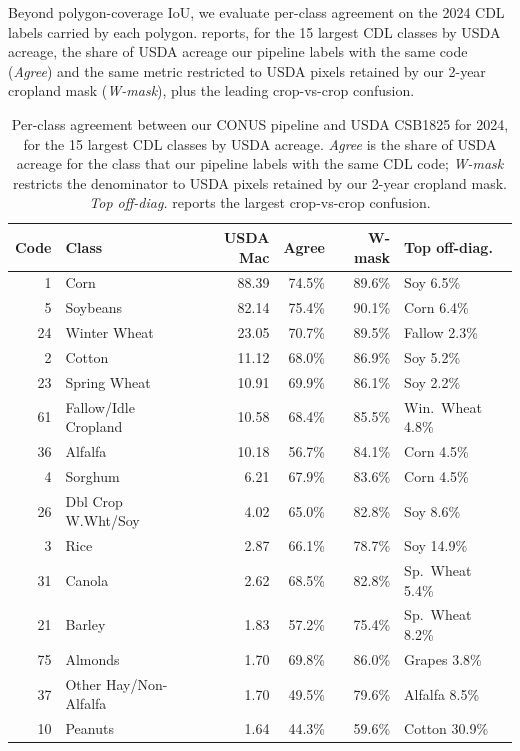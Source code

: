 \documentclass[preprint,12pt]{elsarticle}
\begin{document}
Beyond polygon-coverage IoU, we evaluate per-class agreement on the
2024 CDL labels carried by each polygon.  reports,
for the 15 largest CDL classes by USDA acreage, the share of USDA
acreage our pipeline labels with the same code (\emph{Agree}) and the
same metric restricted to USDA pixels retained by our 2-year cropland
mask (\emph{W-mask}), plus the leading crop-vs-crop confusion.

\begin{table}[t]
\centering
\caption{Per-class agreement between our CONUS pipeline and USDA
CSB1825 for 2024, for the 15 largest CDL classes by USDA acreage.
\emph{Agree} is the share of USDA acreage for the class that our
pipeline labels with the same CDL code; \emph{W-mask} restricts the
denominator to USDA pixels retained by our 2-year cropland mask.
\emph{Top off-diag.} reports the largest crop-vs-crop confusion.}
\label{tab:per-class}
\small
\setlength{\tabcolsep}{4pt}
\begin{tabular}{@{}rlrrrl@{}}
\toprule
Code & Class & USDA Mac & Agree & W-mask & Top off-diag. \\
\midrule
  1 & Corn                      & 88.39 & 74.5\% & 89.6\% & Soy 6.5\%        \\
  5 & Soybeans                  & 82.14 & 75.4\% & 90.1\% & Corn 6.4\%       \\
 24 & Winter Wheat              & 23.05 & 70.7\% & 89.5\% & Fallow 2.3\%     \\
  2 & Cotton                    & 11.12 & 68.0\% & 86.9\% & Soy 5.2\%        \\
 23 & Spring Wheat              & 10.91 & 69.9\% & 86.1\% & Soy 2.2\%        \\
 61 & Fallow/Idle Cropland      & 10.58 & 68.4\% & 85.5\% & Win.\ Wheat 4.8\%\\
 36 & Alfalfa                   & 10.18 & 56.7\% & 84.1\% & Corn 4.5\%       \\
  4 & Sorghum                   &  6.21 & 67.9\% & 83.6\% & Corn 4.5\%       \\
 26 & Dbl Crop W.Wht/Soy        &  4.02 & 65.0\% & 82.8\% & Soy 8.6\%        \\
  3 & Rice                      &  2.87 & 66.1\% & 78.7\% & Soy 14.9\%       \\
 31 & Canola                    &  2.62 & 68.5\% & 82.8\% & Sp.\ Wheat 5.4\% \\
 21 & Barley                    &  1.83 & 57.2\% & 75.4\% & Sp.\ Wheat 8.2\% \\
 75 & Almonds                   &  1.70 & 69.8\% & 86.0\% & Grapes 3.8\%     \\
 37 & Other Hay/Non-Alfalfa     &  1.70 & 49.5\% & 79.6\% & Alfalfa 8.5\%    \\
 10 & Peanuts                   &  1.64 & 44.3\% & 59.6\% & Cotton 30.9\%    \\
\bottomrule
\end{tabular}
\end{table}
\end{document}
